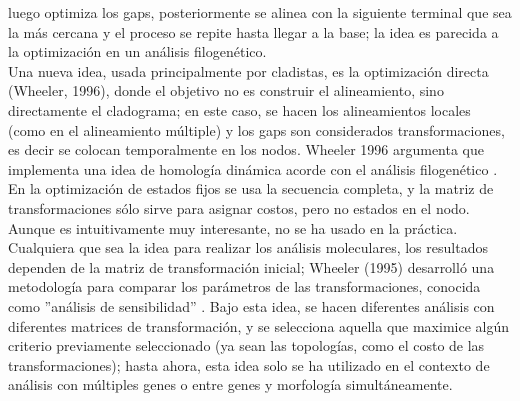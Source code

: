 luego optimiza los gaps, posteriormente se alinea con la siguiente terminal que sea la m\'as cercana y el proceso se repite 
hasta llegar a la base; la idea es parecida a la optimizaci\'on en un an\'alisis filogen\'etico.\\
Una nueva idea, usada principalmente por cladistas, es la optimizaci\'on directa \cite{Wheeler1996}(Wheeler, 1996), donde el 
objetivo no es construir el alineamiento, sino directamente el cladograma; en este caso, se hacen los alineamientos locales 
(como en el alineamiento m\'ultiple) y los gaps son considerados transformaciones, es decir se colocan temporalmente en 
los nodos. Wheeler 1996 argumenta que implementa una idea de homolog\'ia din\'amica acorde con el an\'alisis filogen\'etico \cite{Wheeler1996}. 
En la optimizaci\'on de estados fijos \cite{Wheeler1999} se usa la secuencia completa, y la matriz de transformaciones s\'olo 
sirve para asignar costos, pero no estados en el nodo.  Aunque es intuitivamente muy 
interesante, no se ha usado en la pr\'actica. Cualquiera que sea la idea para realizar los an\'alisis moleculares, los 
resultados dependen de la matriz de transformaci\'on inicial; Wheeler (1995) desarroll\'o una metodolog\'ia para comparar 
los par\'ametros de las transformaciones, conocida como ''an\'alisis de sensibilidad'' \cite{Wheeler1995}.
Bajo esta idea, se hacen diferentes an\'alisis con diferentes matrices de transformaci\'on, y se selecciona aquella que 
maximice alg\'un criterio previamente seleccionado (ya sean las topolog\'ias, como el costo de las transformaciones); hasta 
ahora, esta idea solo se ha utilizado en el contexto de an\'alisis con m\'ultiples genes o entre genes y morfolog\'ia 
simult\'aneamente.



